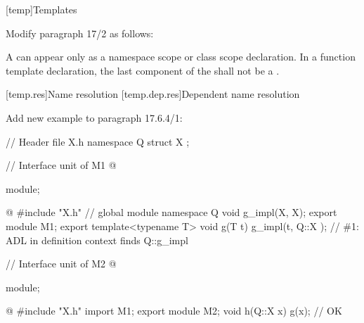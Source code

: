 \setcounter{chapter}{16}
[temp]{Templates}%

\noindent
Modify paragraph 17/2 as follows:
\begin{std.txt}
  \resetalinea[1]
  \alinea
  A  can appear only as a 
  namespace scope or class scope declaration.
  In a function template declaration, the last component of the 
   shall not be a . 
\end{std.txt}






\setcounter{section}{5}
[temp.res]{Name resolution}
\setcounter{subsection}{3}
[temp.dep.res]{Dependent name resolution}

Add new example to paragraph 17.6.4/1:
\begin{std.txt}
  \begin{addedblock}
  \enterexample
  \begin{codeblock}
    // Header file X.h
    namespace Q { 
       struct X { };
    }

    // Interface unit of M1
    @\begin{after}\color{addclr}
    module;
    \end{after}@
    #include "X.h"       // global module
    namespace Q {
       void g_impl(X, X);
    }
    export module M1;
    export template<typename T>
    void g(T t) {
       g_impl(t, Q::X{ });  // \#1: ADL in definition context finds Q::g_impl
    }

    // Interface unit of M2
    @\begin{after}\color{addclr}
    module;
    \end{after}@
    #include "X.h"
    import M1;
    export module M2;
    void h(Q::X x) {
       g(x);               // OK
    }
  \end{codeblock}
  \exitexample
\end{addedblock}
\end{std.txt}


